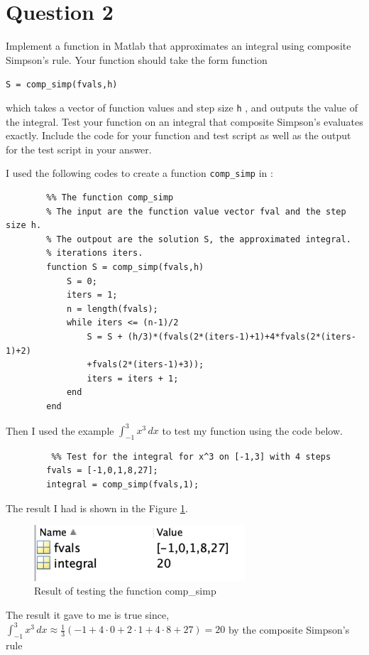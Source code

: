 \section{Question 2}

\begin{question}
    Implement a function in Matlab that approximates an integral using composite Simpson’s rule. Your function should take the form function
    
    \verb+S = comp_simp(fvals,h)+ 
    
    which takes a vector of function values and step size \verb+h+ , and outputs the value of the integral. Test your function on an integral that composite Simpson’s evaluates exactly. Include the code for your function and test script as well as the output for the test script in your answer.
\end{question}

\begin{answer}
    I used the following codes to create a function \verb+comp_simp+ in \MATLAB:
    \begin{verbatim}
        %% The function comp_simp
        % The input are the function value vector fval and the step size h.
        % The outpout are the solution S, the approximated integral.
        % iterations iters.
        function S = comp_simp(fvals,h)
            S = 0;
            iters = 1;
            n = length(fvals);
            while iters <= (n-1)/2
                S = S + (h/3)*(fvals(2*(iters-1)+1)+4*fvals(2*(iters-1)+2)
                +fvals(2*(iters-1)+3));
                iters = iters + 1;
            end
        end
    \end{verbatim}
    Then I used the example $\int_{-1}^{3}x^3\,dx$ to test my function using the code below.
    \begin{verbatim}
         %% Test for the integral for x^3 on [-1,3] with 4 steps
        fvals = [-1,0,1,8,27];
        integral = comp_simp(fvals,1);
    \end{verbatim}
    The result I had is shown in the Figure \ref{fig:fig8}.
    \begin{figure}[H]
        \centering
        \includegraphics[width=0.7\textwidth]{Figure 8.jpg}
        \caption{\label{fig:fig8}Result of testing the function comp\_simp}
    \end{figure}
    The result it gave to me is true since, $\int_{-1}^{3}x^3\,dx \approx \tfrac{1}{3}(-1 + 4\cdot0 + 2\cdot1 + 4\cdot8 + 27) = 20$ by the composite Simpson's rule
\end{answer}